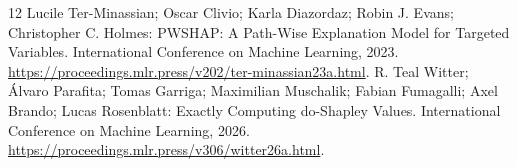 \documentclass{svproc}
\begin{document}
\begin{thebibliography}{12}
 Lucile Ter-Minassian; Oscar Clivio; Karla Diazordaz; Robin J. Evans; Christopher C. Holmes: PWSHAP: A Path-Wise Explanation Model for Targeted Variables. International Conference on Machine Learning, 2023. \url{https://proceedings.mlr.press/v202/ter-minassian23a.html}.
 R. Teal Witter; Álvaro Parafita; Tomas Garriga; Maximilian Muschalik; Fabian Fumagalli; Axel Brando; Lucas Rosenblatt: Exactly Computing do-Shapley Values. International Conference on Machine Learning, 2026. \url{https://proceedings.mlr.press/v306/witter26a.html}.
\end{thebibliography}
\end{document}

